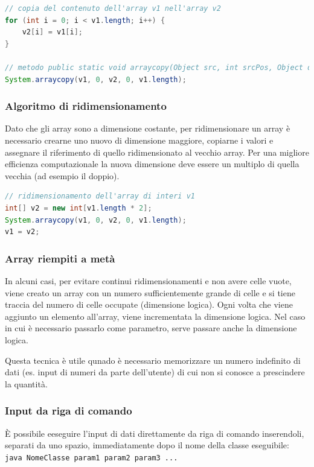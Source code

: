 \documentclass{article}
\begin{document}
\begin{lstlisting}[language=Java]
// copia del contenuto dell'array v1 nell'array v2
for (int i = 0; i < v1.length; i++) {
	v2[i] = v1[i];
}

// metodo public static void arraycopy(Object src, int srcPos, Object dest, int destPos, int length)
System.arraycopy(v1, 0, v2, 0, v1.length);
\end{lstlisting}

\subsubsection*{Algoritmo di ridimensionamento}
Dato che gli array sono a dimensione costante, per ridimensionare un array è necessario crearne uno nuovo di dimensione maggiore,
copiarne i valori e assegnare il riferimento di quello ridimensionato al vecchio array. Per una migliore efficienza computazionale
la nuova dimensione deve essere un multiplo di quella vecchia (ad esempio il doppio).

\begin{lstlisting}[language=Java]
// ridimensionamento dell'array di interi v1
int[] v2 = new int[v1.length * 2];
System.arraycopy(v1, 0, v2, 0, v1.length);
v1 = v2;
\end{lstlisting}

\subsubsection*{Array riempiti a metà}
In alcuni casi, per evitare continui ridimensionamenti e non avere celle vuote, viene creato un array con un numero sufficientemente
grande di celle e si tiene traccia del numero di celle occupate (dimensione logica). Ogni volta che viene aggiunto un elemento
all'array, viene incrementata la dimensione logica. Nel caso in cui è necessario passarlo come parametro, serve passare anche
la dimensione logica.

Questa tecnica è utile qunado è necessario memorizzare un numero indefinito di dati (es. input di numeri da parte dell'utente)
di cui non si conosce a prescindere la quantità.

\subsubsection*{Input da riga di comando}
È possibile eeseguire l'input di dati direttamente da riga di comando inserendoli, separati da uno spazio, immediatamente dopo
il nome della classe eseguibile: \verb|java NomeClasse param1 param2 param3 ...|
\end{document}
